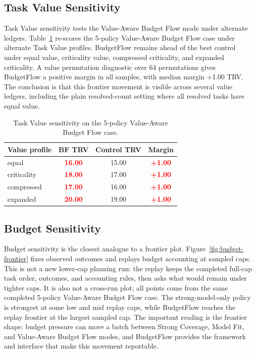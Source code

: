 \documentclass{article}
\newcommand{\method}{BudgetFlow\xspace}
\newcommand{\trv}{TRV\xspace}
\newcommand{\pos}[1]{\textcolor{red}{\textbf{#1}}}
\begin{document}
\subsection{Task Value Sensitivity}
Task Value sensitivity tests the Value-Aware Budget Flow mode under alternate ledgers. Table~\ref{tab:value-sensitivity} re-scores the 5-policy Value-Aware Budget Flow case under alternate Task Value profiles. \method remains ahead of the best control under equal value, criticality value, compressed criticality, and expanded criticality. A value permutation diagnostic over 64 permutations gives \method a positive margin in all samples, with median margin +1.00 \trv. The conclusion is that this frontier movement is visible across several value ledgers, including the plain resolved-count setting where all resolved tasks have equal value.

\begin{table}[t]
\centering
\small
\begin{tabular}{lccc}
\toprule
Value profile & BF TRV & Control TRV & Margin \\
\midrule
equal & \pos{16.00} & 15.00 & \pos{+1.00} \\
criticality & \pos{18.00} & 17.00 & \pos{+1.00} \\
compressed & \pos{17.00} & 16.00 & \pos{+1.00} \\
expanded & \pos{20.00} & 19.00 & \pos{+1.00} \\
\bottomrule
\end{tabular}
\caption{Task Value sensitivity on the 5-policy Value-Aware Budget Flow case.}
\label{tab:value-sensitivity}
\end{table}

\subsection{Budget Sensitivity}
Budget sensitivity is the closest analogue to a frontier plot. Figure~\ref{fig:budget-frontier} fixes observed outcomes and replays budget accounting at sampled caps. This is not a new lower-cap planning run: the replay keeps the completed full-cap task order, outcomes, and accounting rules, then asks what would remain under tighter caps. It is also not a cross-run plot; all points come from the same completed 5-policy Value-Aware Budget Flow case. The strong-model-only policy is strongest at some low and mid replay caps, while \method reaches the replay frontier at the largest sampled cap. The important reading is the frontier shape: budget pressure can move a batch between Strong Coverage, Model Fit, and Value-Aware Budget Flow modes, and \method provides the framework and interface that make this movement reportable.
\end{document}

